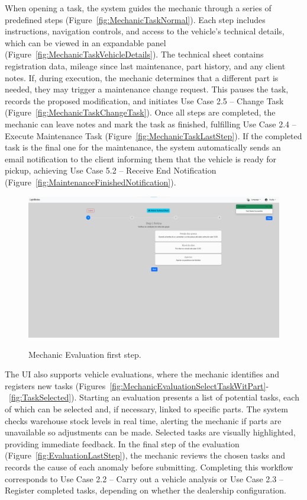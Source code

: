 When opening a task, the system guides the mechanic through a series of predefined steps (Figure~\ref{fig:MechanicTaskNormal}). Each step includes instructions, navigation controls, and access to the vehicle's technical details, which can be viewed in an expandable panel (Figure~\ref{fig:MechanicTaskVehicleDetails}). The technical sheet contains registration data, mileage since last maintenance, part history, and any client notes. If, during execution, the mechanic determines that a different part is needed, they may trigger a maintenance change request. This pauses the task, records the proposed modification, and initiates Use Case 2.5 – Change Task (Figure~\ref{fig:MechanicTaskChangeTask}). Once all steps are completed, the mechanic can leave notes and mark the task as finished, fulfilling Use Case 2.4 – Execute Maintenance Task (Figure~\ref{fig:MechanicTaskLastStep}). If the completed task is the final one for the maintenance, the system automatically sends an email notification to the client informing them that the vehicle is ready for pickup, achieving Use Case 5.2 – Receive End Notification (Figure~\ref{fig:MaintenanceFinishedNotification}).




\begin{figure}[h]
  \caption{Mechanic Evaluation first step.}
  \centering
  \includegraphics[width=\textwidth]{figs/Implementation/mechanic/MechanicEvaluationNormal}
  \label{fig:MechanicEvaluationNormal}
\end{figure}





The \ac{UI} also supports vehicle evaluations, where the mechanic identifies and registers new tasks (Figures~\ref{fig:MechanicEvaluationSelectTaskWitPart}-~\ref{fig:TaskSelected}). Starting an evaluation presents a list of potential tasks, each of which can be selected and, if necessary, linked to specific parts. The system checks warehouse stock levels in real time, alerting the mechanic if parts are unavailable so adjustments can be made. Selected tasks are visually highlighted, providing immediate feedback. In the final step of the evaluation (Figure~\ref{fig:EvaluationLastStep}), the mechanic reviews the chosen tasks and records the cause of each anomaly before submitting. Completing this workflow corresponds to Use Case 2.2 – Carry out a vehicle analysis or Use Case 2.3 – Register completed tasks, depending on whether the dealership configuration.


